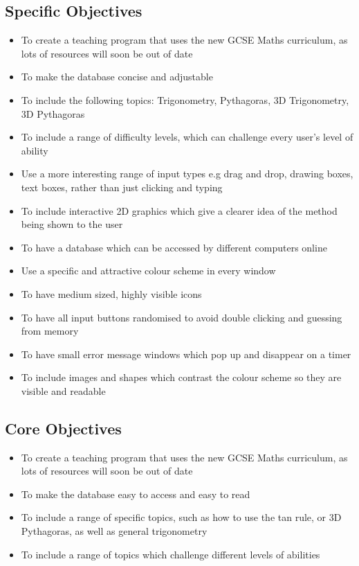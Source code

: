 \subsection{Specific Objectives}

\begin{itemize}
	\item To create a teaching program that uses the new GCSE Maths curriculum, as lots of resources will soon be out of date
	\item To make the database concise and adjustable
	\item To include the following topics: Trigonometry, Pythagoras, 3D Trigonometry, 3D Pythagoras
	\item To include a range of difficulty levels, which can challenge every user's level of ability
	\item Use a more interesting range of input types e.g drag and drop, drawing boxes, text boxes, rather than just clicking and typing
	\item To include interactive 2D graphics which give a clearer idea of the method being shown to the user
	\item To have a database which can be accessed by different computers online
	\item Use a specific and attractive colour scheme in every window
	\item To have medium sized, highly visible icons
	\item To have all input buttons randomised to avoid double clicking and guessing from memory
	\item To have small error message windows which pop up and disappear on a timer
	\item To include images and shapes which contrast the colour scheme so they are visible and readable
\end{itemize}

\subsection{Core Objectives}

\begin{itemize}
	\item To create a teaching program that uses the new GCSE Maths curriculum, as lots of resources will soon be out of date
	\item To make the database easy to access and easy to read
	\item To include a range of specific topics, such as how to use the tan rule, or 3D Pythagoras, as well as general trigonometry
	\item To include a range of topics which challenge different levels of abilities
\end{itemize}

